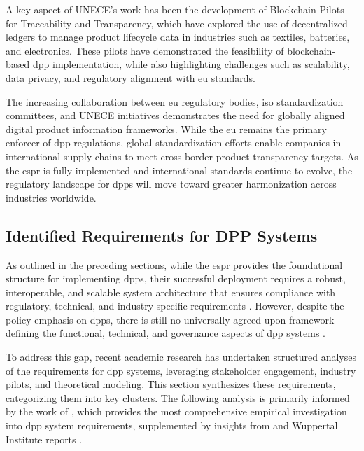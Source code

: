 A key aspect of UNECE’s work has been the development of Blockchain Pilots for Traceability and Transparency, which have explored the use of decentralized ledgers to manage product lifecycle data in industries such as textiles, batteries, and electronics. These pilots have demonstrated the feasibility of blockchain-based \ac{dpp} implementation, while also highlighting challenges such as scalability, data privacy, and regulatory alignment with \ac{eu} standards. \autocite{Heemskerk.2025}

The increasing collaboration between \ac{eu} regulatory bodies, \ac{iso} standardization committees, and UNECE initiatives demonstrates the need for globally aligned digital product information frameworks. While the \ac{eu} remains the primary enforcer of \ac{dpp} regulations, global standardization efforts enable companies in international supply chains to meet cross-border product transparency targets. As the \ac{espr} is fully implemented and international standards continue to evolve, the regulatory landscape for \ac{dpp}s will move toward greater harmonization across industries worldwide.

\subsection{Identified Requirements for DPP Systems}

As outlined in the preceding sections, while the \ac{espr} provides the foundational structure for implementing \ac{dpp}s, their successful deployment requires a robust, interoperable, and scalable system architecture that ensures compliance with regulatory, technical, and industry-specific requirements \autocite{EuropeanParliamentandCouncil.2024}. However, despite the policy emphasis on \ac{dpp}s, there is still no universally agreed-upon framework defining the functional, technical, and governance aspects of \ac{dpp} systems \autocite{Jansen.2023}.

To address this gap, recent academic research has undertaken structured analyses of the requirements for \ac{dpp} systems, leveraging stakeholder engagement, industry pilots, and theoretical modeling. This section synthesizes these requirements, categorizing them into key clusters. The following analysis is primarily informed by the work of \textcite{Jansen.2023}, which provides the most comprehensive empirical investigation into \ac{dpp} system requirements, supplemented by insights from \textcite{Plociennik.2022} and Wuppertal Institute reports \autocite{Berg.2022}.

